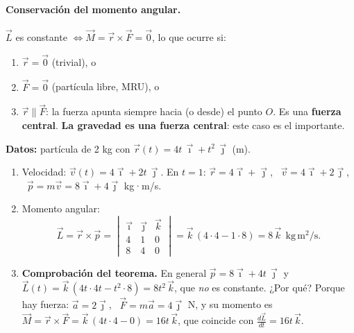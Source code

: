 \documentclass[11pt,a4paper]{article}
\newcommand{\ii}{\vec{\imath}}
\newcommand{\jj}{\vec{\jmath}}
\newcommand{\kk}{\vec{k}}
\begin{document}
\paragraph{Conservación del momento angular.} $\vec L$ es constante $\iff\vec M=\vec r\times\vec F=\vec 0$, lo que ocurre si:
\begin{enumerate}[itemsep=1pt]
  \item $\vec r=\vec 0$ (trivial), o
  \item $\vec F=\vec 0$ (partícula libre, MRU), o
  \item $\vec r\parallel\vec F$: la fuerza apunta siempre hacia (o desde) el punto $O$. Es una \textbf{fuerza central}. \textbf{La gravedad es una fuerza central}: este caso es el importante.
\end{enumerate}

\begin{ejemplo}[title={Ejemplo: momento lineal y angular en $t=1$ s}]
\textbf{Datos:} partícula de 2 kg con $\vec r(t)=4t\,\ii+t^2\,\jj$ (m).
\begin{enumerate}[itemsep=3pt]
  \item Velocidad: $\vec v(t)=4\ii+2t\,\jj$. En $t=1$: $\vec r=4\ii+\jj$, \ $\vec v=4\ii+2\jj$, \ $\vec p=m\vec v=8\ii+4\jj$ kg·m/s.
  \item Momento angular:
  \[\vec L=\vec r\times\vec p=\begin{vmatrix}\ii&\jj&\kk\\4&1&0\\8&4&0\end{vmatrix}=\kk\,(4\cdot4-1\cdot8)=8\,\kk\ \ \mathrm{kg\,m^2/s}.\]
  \item \textbf{Comprobación del teorema.} En general $\vec p=8\ii+4t\,\jj$ y $\vec L(t)=\kk\,(4t\cdot4t-t^2\cdot8)=8t^2\,\kk$, que \emph{no} es constante. ¿Por qué? Porque hay fuerza: $\vec a=2\jj$, \ $\vec F=m\vec a=4\jj$ N, y su momento es $\vec M=\vec r\times\vec F=\kk\,(4t\cdot4-0)=16t\,\kk$, que coincide con $\frac{d\vec L}{dt}=16t\,\kk$. \checkmark
\end{enumerate}
\end{ejemplo}
\end{document}
